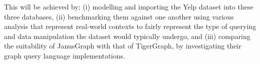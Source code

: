 This will be achieved by; (i) modelling and importing the Yelp dataset into these three databases, (ii) benchmarking them against one another using various analysis that represent real-world contexts to fairly represent the type of querying and data manipulation the dataset would typically undergo, and (iii) comparing the suitability of JanusGraph with that of TigerGraph, by investigating their graph query language implementations.
